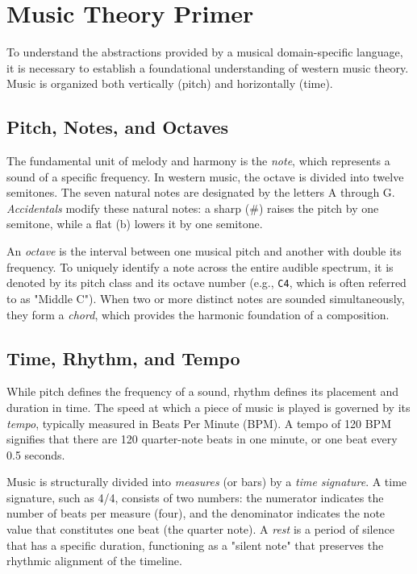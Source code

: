 \section{Music Theory Primer}\label{sec:background-music-theory}

To understand the abstractions provided by a musical domain-specific language, it is necessary to establish a
foundational understanding of western music theory.
Music is organized both vertically (pitch) and horizontally (time).

\subsection{Pitch, Notes, and Octaves}

The fundamental unit of melody and harmony is the \textit{note}, which represents a sound of a specific frequency.
In western music, the octave is divided into twelve semitones.
The seven natural notes are designated by the letters A through G.
\textit{Accidentals} modify these natural notes: a sharp (\#) raises the pitch by one semitone, while a flat
(b) lowers it by one semitone.

An \textit{octave} is the interval between one musical pitch and another with double its frequency.
To uniquely identify a note across the entire audible spectrum, it is denoted by its pitch class and its
octave number (e.g., \texttt{C4}, which is often referred to as "Middle C").
When two or more distinct notes are sounded simultaneously, they form a \textit{chord}, which provides the
harmonic foundation of a composition.

\subsection{Time, Rhythm, and Tempo}

While pitch defines the frequency of a sound, rhythm defines its placement and duration in time.
The speed at which a piece of music is played is governed by its \textit{tempo}, typically measured in Beats
Per Minute (BPM).
A tempo of 120 BPM signifies that there are 120 quarter-note beats in one minute, or one beat every 0.5 seconds.

Music is structurally divided into \textit{measures} (or bars) by a \textit{time signature}.
A time signature, such as 4/4, consists of two numbers: the numerator indicates the number of beats per
measure (four), and the denominator indicates the note value that constitutes one beat (the quarter note).
A \textit{rest} is a period of silence that has a specific duration, functioning as a "silent note" that
preserves the rhythmic alignment of the timeline.
